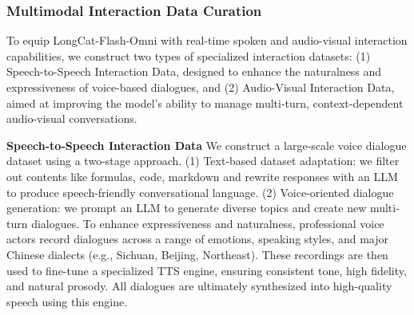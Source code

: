 \documentclass{article}
\newcommand{\longcat}{LongCat-Flash-Omni\xspace}
\begin{document}
\subsubsection{Multimodal Interaction Data Curation}
 \noindent
To equip \longcat with real-time spoken and audio-visual interaction capabilities, we construct two types of specialized interaction datasets: (1) Speech-to-Speech Interaction Data, designed to enhance the naturalness and expressiveness of voice-based dialogues, and (2) Audio-Visual Interaction Data, aimed at improving the model’s ability to manage multi-turn, context-dependent audio-visual conversations.

\textbf{Speech-to-Speech Interaction Data} We construct a large-scale voice dialogue dataset using a two-stage approach. (1) Text-based dataset adaptation: we filter out contents like formulas, code, markdown and rewrite responses with an LLM to produce speech-friendly conversational language. (2) Voice-oriented dialogue generation: we prompt an LLM to generate diverse topics and create new multi-turn dialogues.
To enhance expressiveness and naturalness, professional voice actors record dialogues across a range of emotions, speaking styles, and major Chinese dialects (e.g., Sichuan, Beijing, Northeast). These recordings are then used to fine-tune a specialized TTS engine, ensuring consistent tone, high fidelity, and natural prosody. All dialogues are ultimately synthesized into high-quality speech using this engine.
\end{document}
